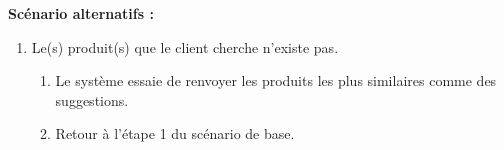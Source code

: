 \textbf{Scénario alternatifs : }
\begin{enumerate}
	\item Le(s) produit(s) que le client cherche n'existe pas.
	      \begin{enumerate}
		      \item Le système essaie de renvoyer les produits les plus similaires comme des suggestions.
		      \item Retour à l'étape 1 du scénario de base.
	      \end{enumerate}
\end{enumerate}